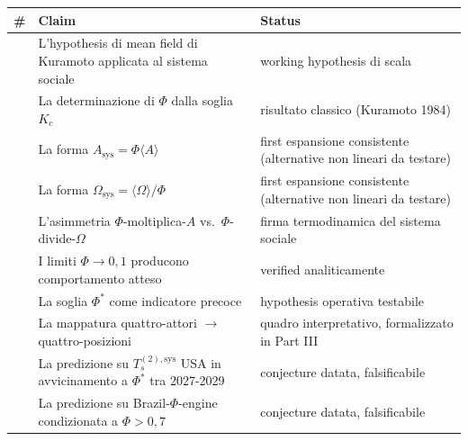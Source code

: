 {\def\LTcaptype{none} %
{\small\begin{longtable}[]{@{}
  >{\raggedright\arraybackslash}p{}
  >{\raggedright\arraybackslash}p{}
  >{\raggedright\arraybackslash}p{}@{}}
\toprule\noalign{}
\begin{minipage}[b]{\linewidth}\raggedright
\#
\end{minipage} & \begin{minipage}[b]{\linewidth}\raggedright
Claim
\end{minipage} & \begin{minipage}[b]{\linewidth}\raggedright
Status
\end{minipage} \\
\midrule\noalign{}
\endhead
\bottomrule\noalign{}
\endlastfoot
1 & L'hypothesis di mean field di Kuramoto applicata al sistema sociale &
\Hypoth{} working hypothesis di scala \\
2 & La determinazione di \(\Phi\) dalla soglia \(K_c\) & \Proved{}
risultato classico (Kuramoto 1984) \\
3 & La forma \(A_{\text{sys}} = \Phi \langle A\rangle\) & \Hypoth{}
first espansione consistente (alternative non lineari da testare) \\
4 & La forma \(\Omega_{\text{sys}} = \langle\Omega\rangle/\Phi\) &
\Hypoth{} first espansione consistente (alternative non lineari da
testare) \\
5 & L'asimmetria \(\Phi\)-moltiplica-\(A\)
vs.~\(\Phi\)-divide-\(\Omega\) & \Hypoth{} firma termodinamica del
sistema sociale \\
6 & I limiti \(\Phi \to 0, 1\) producono comportamento atteso &
\Proved{} verified analiticamente \\
7 & La soglia \(\Phi^*\) come indicatore precoce & \Hypoth{} hypothesis
operativa testabile \\
8 & La mappatura quattro-attori $\to$ quattro-posizioni & \Hypoth{} quadro
interpretativo, formalizzato in Part III \\
9 & La predizione su \(T_s^{(2),\text{sys}}\) USA in avvicinamento a
\(\Phi^*\) tra 2027-2029 & \Conj{} conjecture datata, falsificabile \\
10 & La predizione su Brazil-$\Phi$-engine condizionata a \(\Phi > 0{,}7\) &
\Conj{} conjecture datata, falsificabile \\
\end{longtable}}
}


